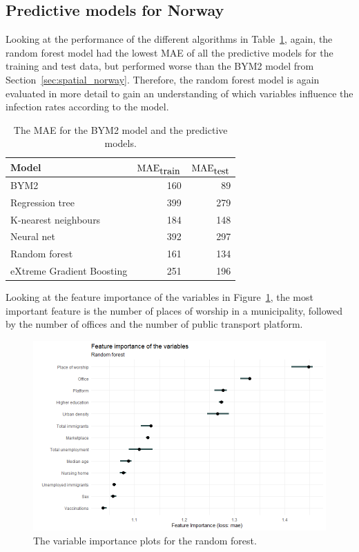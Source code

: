 \subsection{Predictive models for Norway}
Looking at the performance of the different algorithms in Table~\ref{pred_perf_norway}, again, the random forest model had the lowest MAE of all the predictive models for the training and test data, but performed worse than the BYM2 model from Section~\ref{sec:spatial_norway}. Therefore, the random forest model is again evaluated in more detail to gain an understanding of which variables influence the infection rates according to the model.
\begin{table}[H] 
\caption{The MAE for the BYM2 model and the predictive models. \label{pred_perf_norway}}
\begin{tabular}{l r r}
\toprule
\textbf{Model}	& \textbf{$\hbox{MAE}_{\hbox{train}}$} & \textbf{$\hbox{MAE}_{\hbox{test}}$}\\
\midrule
BYM2 & 160 & 89\\
Regression tree & 399 & 279 \\
K-nearest neighbours & 184 & 148 \\
Neural net & 392 & 297 \\
Random forest & 161 & 134 \\
eXtreme Gradient Boosting & 251 & 196 \\
\bottomrule
\end{tabular}
\end{table}
Looking at the feature importance of the variables in Figure~\ref{importance_rf_norway}, the most important feature is the number of places of worship in a municipality, followed by the number of offices and the number of public transport platform. \\
\begin{figure}[H]
  \centering
  \includegraphics[width = \textwidth]{importance_rf_norway.png}
  \caption{The variable importance plots for the random forest.}
  \label{importance_rf_norway}
\end{figure}
